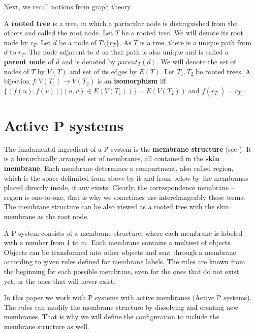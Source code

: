 \documentclass[llncs,submission,copyright,creativecommons]{../lib/lncs/llncs}
\begin{document}
Next, we recall notions from graph theory.

A {\bf rooted tree} is a tree, in which a particular node is distinguished from the others and called the root node.
Let $T$ be a rooted tree. We will denote its root node by $r_T$.
Let $d$ be a node of $T\setminus\{r_T\}$.
As $T$ is a tree, there is a unique path from $d$ to $r_T$. 
The node adjacent to $d$ on that path is also unique and is called a {\bf parent node} of $d$ and is denoted by $parent_T(d)$.
We will denote the set of nodes of $T$ by $V(T)$ and set of its edges by $E(T)$.
Let $T_1, T_2$ be rooted trees. A bijection $f: V(T_1)\rightarrow V(T_2)$ is an {\bf isomorphism} iff $\{(f(u),f(v))|(u,v)\in E(V(T_1))\} = E(V(T_2))$ and $f(r_{T_1}) = r_{T_2}$. 

  
\section{Active P systems}
\label{sec:p systems}


The fundamental ingredient of a P system is the {\bf membrane structure} (see \cite{Paun2006Introduction}). It is a hierarchically arranged set of membranes, all contained in the {\bf skin membrane}. Each membrane determines a compartment, also called region, which is the space delimited from above by it and from below by the membranes placed directly inside, if any exists. Clearly, the correspondence membrane – region is one-to-one, that is why we sometimes use interchangeably these terms.
The membrane structure can be also viewed as a rooted tree with the skin membrane as the root node.

A P system consists of a membrane structure, where each membrane is labeled with a number from 1 to $m$. Each membrane contains a multiset of objects. Objects can be transformed into other objects and sent through a membrane according to given rules defined for membrane labels. The rules are known from the beginning for each possible membrane, even for the ones that do not exist yet, or the ones that will never exist.

In this paper we work with P systems with active membranes (Active P systems). The rules can modify the membrane structure by dissolving and creating new membranes. That is why we will define the configuration to include the membrane structure as well.



\end{document}
